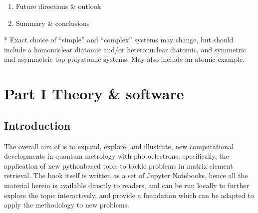 \documentclass[letterpaper,table,10pt,english]{jupyterBook}
\begin{document}
\begin{enumerate}
\sphinxAtStartPar
c.  Direct molecular frame reconstruction via matrix\sphinxhyphen{}inversion
methods.

\sphinxAtStartPar
d.  Comparison of methods.

\sphinxAtStartPar
e.  Information content/quantum information analysis.

\item {} 
\sphinxAtStartPar
Future directions \& outlook

\item {} 
\sphinxAtStartPar
Summary \& conclusions

\end{enumerate}

\sphinxAtStartPar
* Exact choice of “simple” and “complex” systems may change, but should
include a homonuclear diatomic and/or heteronuclear diatomic, and
symmetric and asymmetric top polyatomic systems. May also include an
atomic example.

\sphinxstepscope


\part{Part I \sphinxhyphen{} Theory \& software}

\sphinxstepscope


\chapter{Introduction}
\label{\detokenize{part1/main_intro_060723:introduction}}\label{\detokenize{part1/main_intro_060723:chpt-intro}}\label{\detokenize{part1/main_intro_060723::doc}}
\sphinxAtStartPar
The overall aim of  is to expand, explore, and illustrate, new computational developments in quantum metrology with photoelectrons: specifically, the application of new python\sphinxhyphen{}based tools to tackle problems in matrix element retrieval. The book itself is written as a set of Jupyter Notebooks, hence all the material herein is available directly to readers, and can be run locally to further explore the topic interactively, and provide a foundation which can be adapted to apply the methodology to new problems.
\end{document}
